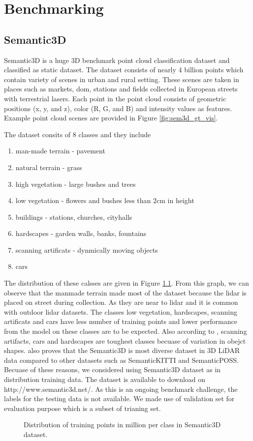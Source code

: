 

    \chapter{Benchmarking}
    \section{Semantic3D}
Semantic3D is a huge 3D benchmark point cloud classification dataset and classified as static dataset.
The dataset consists of nearly 4 billion points which contain variety of scenes in urban and rural setting.
These scenes are taken in places such as markets, dom, stations and fields collected in European streets with terrestrial lasers.
Each point in the point cloud consists of geometric positions (x, y, and z), color (R, G, and B) and intensity values as features.
Example point cloud scenes are provided in Figure \ref{fig:sem3d_gt_vis}. 

The dataset consits of 8 classes and they include
\begin{enumerate}
    \item man-made terrain - pavement
    \item natural terrain - grass
    \item high vegetation - large bushes and trees
    \item low vegetation - flowers and bushes less than 2cm in height
    \item buildings - stations, churches, cityhalls
    \item hardscapes - garden walls, banks, fountains
    \item scanning artificats - dynmically moving objects
    \item cars
\end{enumerate}
The distribution of these calsses are given in Figure \ref{fig:sem3ddist}.
From this graph, we can observe that the manmade terrain made most of the dataset because the lidar is placed on street during collection.
As they are near to lidar and it is common with outdoor lidar datasets.
The classes low vegetation, hardscapes, scanning artificats and cars have less number of training points and lower performance from the model on these classes are to be expected.
Also according to \cite{hackel2017semantic3d}, scanning artifacts, cars and hardscapes are toughest classes becuase of variation in obejct shapes.
\cite{survey3d} also proves that the Semantic3D is most diverse dataset in 3D LiDAR data compared to other datasets such as SemanticKITTI and SemanticPOSS.
Becuase of these reasons, we considered using Semantic3D dataset as in distribution training data.
The dataset is available to download on http://www.semantic3d.net/. 
As this is an ongoing benchmark challenge, the labels for the testing data is not available.
We made use of validation set for evaluation purpose which is a subset of trianing set.
\begin{figure}[h!]
    \centering
    
    \caption{Distribution of training points in million per class in Semantic3D dataset.}
    \label{fig:sem3ddist}
\end{figure}


